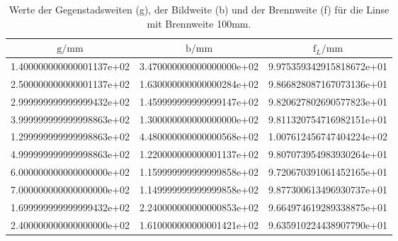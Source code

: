 \begin{table}
  \centering
  \begin{tabular}{S[round-precision = 0] S[round-precision = 0] S }
    \toprule
    $\text{g} / \si{\milli\meter}$ &
     $\text{b}/\si{\milli\meter} $ & $\text{f}_L / \si{\milli\meter}$\\
    \midrule
    1.400000000000001137e+02 & 3.470000000000000000e+02 & 9.975359342915818672e+01\\
    2.500000000000001137e+02 & 1.630000000000000284e+02 & 9.866828087167073136e+01\\
    2.999999999999999432e+02 & 1.459999999999999147e+02 & 9.820627802690577823e+01\\
    3.999999999999998863e+02 & 1.300000000000000000e+02 & 9.811320754716982151e+01\\
    1.299999999999998863e+02 & 4.480000000000000568e+02 & 1.007612456747404224e+02\\
    4.999999999999998863e+02 & 1.220000000000001137e+02 & 9.807073954983930264e+01\\
    6.000000000000000000e+02 & 1.159999999999999858e+02 & 9.720670391061452165e+01\\
    7.000000000000000000e+02 & 1.149999999999999858e+02 & 9.877300613496930737e+01\\
    1.699999999999999432e+02 & 2.240000000000000853e+02 & 9.664974619289338875e+01\\
    2.400000000000000000e+02 & 1.610000000000001421e+02 & 9.635910224438907790e+01\\
    \bottomrule
  \end{tabular}
  \caption{Werte der Gegenstadsweiten (g), der Bildweite (b)
  und der Brennweite (f) für die Linse mit Brennweite 100mm. }
  \label{tab:Lgb}
\end{table}
